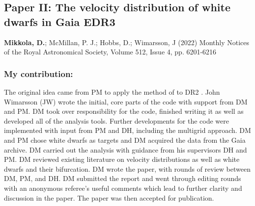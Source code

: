 \subsection*{Paper II: The velocity distribution of white dwarfs in Gaia EDR3}
\textbf{Mikkola, D.}; McMillan, P. J.; Hobbs, D.; Wimarsson, J (2022) \newline
Monthly Notices of the Royal Astronomical Society, Volume 512, Issue 4, pp. 6201-6216 \newline

\subsubsection*{My contribution:}
The original idea came from PM to apply the method of \cite{dehnen:98a} to DR2 \citep{dr2}. John Wimarsson (JW) wrote the initial, core parts of the code with support from DM and PM. DM took over responsibility for the code, finished writing it as well as developed all of the analysis tools. Further developments for the code were implemented with input from PM and DH, including the multigrid approach. DM and PM chose white dwarfs as targets and DM acquired the data from the Gaia archive. DM carried out the analysis with guidance from his supervisors DH and PM. DM reviewed existing literature on velocity distributions as well as white dwarfs and their bifurcation. DM wrote the paper, with rounds of review between DM, PM, and DH. DM submitted the report and went through editing rounds with an anonymous referee's useful comments which lead to further clarity and discussion in the paper. The paper was then accepted for publication.